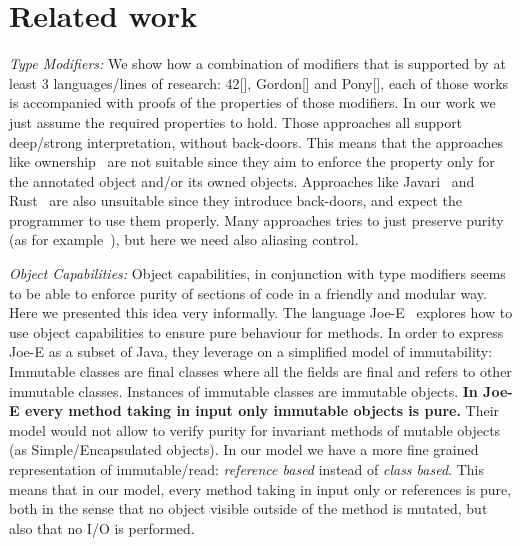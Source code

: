 
\saveSpace
\section{Related work}
\label{s:related}
\saveSpace

\noindent\textit{Type Modifiers:}
We show how a combination of modifiers that is supported by at least 3 languages/lines of research:
42[], Gordon[] and Pony[], each of those works is accompanied with proofs of the properties of those modifiers.
In our work we just assume the required properties to hold.
 Those approaches all support deep/strong interpretation, without back-doors.
This means that the approaches like ownership~\cite{ClarkeEtAl13,ZibinEtAl10,DietlEtAl07}
are not suitable since they aim to enforce the property only for
the annotated object and/or its owned objects.
Approaches like Javari~\cite{TschantzErnst05,Boyland06} and Rust~\cite{matsakis2014rust}
are also unsuitable since they introduce back-doors, and expect the programmer to use them properly.
Many approaches tries to just preserve purity (as for example~\cite{pearce2011jpure}),
but here we need also aliasing control.




\noindent
\textit{Object Capabilities:}
Object capabilities, in conjunction with type modifiers seems to be able to
 enforce purity of sections of code in a friendly and modular way.
Here we presented this idea very informally.
The language Joe-E~\cite{finifter2008verifiable}
explores how to use object capabilities to ensure
pure behaviour for methods.
In order to express Joe-E as a subset of Java,
they leverage on a simplified model of immutability:
Immutable classes are final classes where all the fields are final and refers to other immutable classes.
Instances of immutable classes are immutable objects.
\textbf{In Joe-E every method taking in input only immutable objects is pure.}
Their model would not allow to verify purity for invariant methods of mutable objects
 (as Simple/Encapsulated objects).
In our model we have a more fine grained representation of immutable/read:
 \emph{reference based} instead of \emph{class based}.
This means that in our model, every method taking in input only \Q@read@ or \Q@imm@ references is pure,
both in the sense that no object visible outside of the method is mutated, but also
that no I/O is performed.



